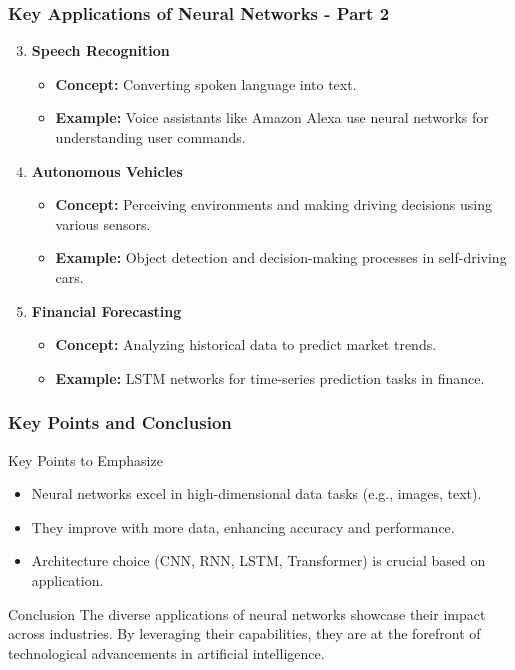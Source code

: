 \documentclass[aspectratio=169]{beamer}
\begin{document}
\begin{frame}[fragile]
    \frametitle{Key Applications of Neural Networks - Part 2}
    \begin{enumerate}
        \setcounter{enumi}{2}
        \item \textbf{Speech Recognition}
        \begin{itemize}
            \item \textbf{Concept:} Converting spoken language into text.
            \item \textbf{Example:} Voice assistants like Amazon Alexa use neural networks for understanding user commands.
        \end{itemize}
        
        \item \textbf{Autonomous Vehicles}
        \begin{itemize}
            \item \textbf{Concept:} Perceiving environments and making driving decisions using various sensors.
            \item \textbf{Example:} Object detection and decision-making processes in self-driving cars.
        \end{itemize}
        
        \item \textbf{Financial Forecasting}
        \begin{itemize}
            \item \textbf{Concept:} Analyzing historical data to predict market trends.
            \item \textbf{Example:} LSTM networks for time-series prediction tasks in finance.
        \end{itemize}
    \end{enumerate}
\end{frame}

\begin{frame}[fragile]
    \frametitle{Key Points and Conclusion}
    \begin{block}{Key Points to Emphasize}
        \begin{itemize}
            \item Neural networks excel in high-dimensional data tasks (e.g., images, text).
            \item They improve with more data, enhancing accuracy and performance.
            \item Architecture choice (CNN, RNN, LSTM, Transformer) is crucial based on application.
        \end{itemize}
    \end{block}

    \begin{block}{Conclusion}
        The diverse applications of neural networks showcase their impact across industries. By leveraging their capabilities, they are at the forefront of technological advancements in artificial intelligence.
    \end{block}
\end{frame}
\end{document}
